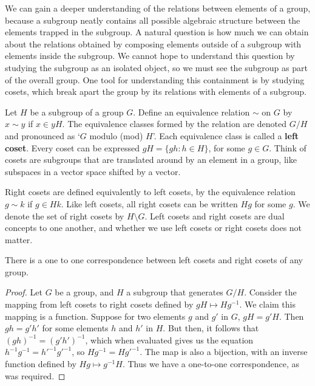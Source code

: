 We can gain a deeper understanding of the relations between elements of a group, because a subgroup neatly contains all possible algebraic structure between the elements trapped in the subgroup. A natural question is how much we can obtain about the relations obtained by composing elements outside of a subgroup with elements inside the subgroup. We cannot hope to understand this question by studying the subgroup as an isolated object, so we must see the subgroup as part of the overall group. One tool for understanding this containment is by studying cosets, which break apart the group by its relations with elements of a subgroup.

\begin{definition}
    Let $H$ be a subgroup of a group $G$. Define an equivalence relation $\sim$ on $G$ by $x \sim y$ if $x \in yH$. The equivalence classes formed by the relation are denoted $G/H$ and pronounced as `$G$ modulo (mod) $H$'. Each equivalence class is called a {\bf left coset}. Every coset can be expressed $gH = \{ gh : h \in H \}$, for some $g \in G$. Think of cosets are subgroups that are translated around by an element in a group, like subspaces in a vector space shifted by a vector.
\end{definition}

Right cosets are defined equivalently to left cosets, by the equivalence relation $g \sim k$ if $g \in Hk$. Like left cosets, all right cosets can be written $Hg$ for some $g$. We denote the set of right cosets by $H \setminus G$. Left cosets and right cosets are dual concepts to one another, and whether we use left cosets or right cosets does not matter.

\begin{lemma} There is a one to one correspondence between left cosets and right cosets of any group. \end{lemma}
\begin{proof}
Let $G$ be a group, and $H$ a subgroup that generates $G/H$. Consider the mapping from left cosets to right cosets defined by $gH \mapsto Hg^{-1}$. We claim this mapping is a function. Suppose for two elements $g$ and $g'$ in $G$, $gH = g'H$. Then $gh = g'h'$ for some elements $h$ and $h'$ in $H$. But then, it follows that $(gh)^{-1} = (g'h')^{-1}$, which when evaluated gives us the equation $h^{-1}g^{-1} = h'^{-1}g'^{-1}$, so $Hg^{-1} = Hg'^{-1}$. The map is also a bijection, with an inverse function defined by $Hg \mapsto g^{-1}H$. Thus we have a one-to-one correspondence, as was required.
\end{proof}

